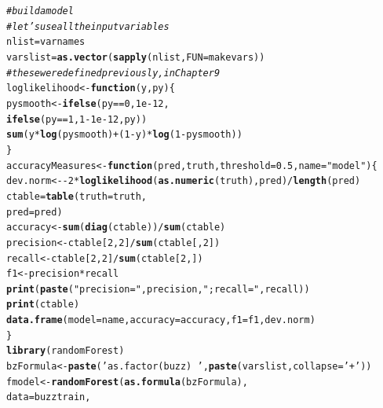 \documentclass{article}\usepackage[]{graphicx}\usepackage[]{color}
\makeatletter
\newcommand{\hlnum}[1]{\textcolor[rgb]{0.686,0.059,0.569}{#1}}%
\newcommand{\hlstr}[1]{\textcolor[rgb]{0.192,0.494,0.8}{#1}}%
\newcommand{\hlcom}[1]{\textcolor[rgb]{0.678,0.584,0.686}{\textit{#1}}}%
\newcommand{\hlopt}[1]{\textcolor[rgb]{0,0,0}{#1}}%
\newcommand{\hlstd}[1]{\textcolor[rgb]{0.345,0.345,0.345}{#1}}%
\newcommand{\hlkwa}[1]{\textcolor[rgb]{0.161,0.373,0.58}{\textbf{#1}}}%
\newcommand{\hlkwb}[1]{\textcolor[rgb]{0.69,0.353,0.396}{#1}}%
\newcommand{\hlkwc}[1]{\textcolor[rgb]{0.333,0.667,0.333}{#1}}%
\newcommand{\hlkwd}[1]{\textcolor[rgb]{0.737,0.353,0.396}{\textbf{#1}}}%
\newenvironment{kframe}{%
 \def\at@end@of@kframe{}%
 \ifinner\ifhmode%
  \def\at@end@of@kframe{\end{minipage}}%
  \begin{minipage}{\columnwidth}%
 \fi\fi%
 \def\FrameCommand##1{\hskip\@totalleftmargin \hskip-\fboxsep
 \colorbox{shadecolor}{##1}\hskip-\fboxsep
     \hskip-\linewidth \hskip-\@totalleftmargin \hskip\columnwidth}%
 \MakeFramed {\advance\hsize-\width
   \@totalleftmargin\z@ \linewidth\hsize
   \@setminipage}}%
 {\par\unskip\endMakeFramed%
 \at@end@of@kframe}
\newenvironment{knitrout}{}{} %
\makeatother
\begin{document}
\begin{knitrout}
\color{fgcolor}\begin{kframe}
\begin{alltt}
\hlcom{# build a model}
\hlcom{# let's use all the input variables}
\hlstd{nlist} \hlkwb{=} \hlstd{varnames}
\hlstd{varslist} \hlkwb{=} \hlkwd{as.vector}\hlstd{(}\hlkwd{sapply}\hlstd{(nlist,} \hlkwc{FUN}\hlstd{=makevars))}
\hlcom{# these were defined previously,  in Chapter 9}
\hlstd{loglikelihood} \hlkwb{<-} \hlkwa{function}\hlstd{(}\hlkwc{y}\hlstd{,} \hlkwc{py}\hlstd{) \{}
  \hlstd{pysmooth} \hlkwb{<-} \hlkwd{ifelse}\hlstd{(py}\hlopt{==}\hlnum{0}\hlstd{,} \hlnum{1e-12}\hlstd{,}
                     \hlkwd{ifelse}\hlstd{(py}\hlopt{==}\hlnum{1}\hlstd{,} \hlnum{1}\hlopt{-}\hlnum{1e-12}\hlstd{, py))}
  \hlkwd{sum}\hlstd{(y} \hlopt{*} \hlkwd{log}\hlstd{(pysmooth)} \hlopt{+} \hlstd{(}\hlnum{1}\hlopt{-}\hlstd{y)}\hlopt{*}\hlkwd{log}\hlstd{(}\hlnum{1} \hlopt{-} \hlstd{pysmooth))}
\hlstd{\}}
\hlstd{accuracyMeasures} \hlkwb{<-} \hlkwa{function}\hlstd{(}\hlkwc{pred}\hlstd{,} \hlkwc{truth}\hlstd{,} \hlkwc{threshold}\hlstd{=}\hlnum{0.5}\hlstd{,} \hlkwc{name}\hlstd{=}\hlstr{"model"}\hlstd{) \{}
  \hlstd{dev.norm} \hlkwb{<-} \hlopt{-}\hlnum{2}\hlopt{*}\hlkwd{loglikelihood}\hlstd{(}\hlkwd{as.numeric}\hlstd{(truth), pred)}\hlopt{/}\hlkwd{length}\hlstd{(pred)}
  \hlstd{ctable} \hlkwb{=} \hlkwd{table}\hlstd{(}\hlkwc{truth}\hlstd{=truth,}
                 \hlkwc{pred}\hlstd{=pred)}
  \hlstd{accuracy} \hlkwb{<-} \hlkwd{sum}\hlstd{(}\hlkwd{diag}\hlstd{(ctable))}\hlopt{/}\hlkwd{sum}\hlstd{(ctable)}
  \hlstd{precision} \hlkwb{<-} \hlstd{ctable[}\hlnum{2}\hlstd{,}\hlnum{2}\hlstd{]}\hlopt{/}\hlkwd{sum}\hlstd{(ctable[,}\hlnum{2}\hlstd{])}
  \hlstd{recall} \hlkwb{<-} \hlstd{ctable[}\hlnum{2}\hlstd{,}\hlnum{2}\hlstd{]}\hlopt{/}\hlkwd{sum}\hlstd{(ctable[}\hlnum{2}\hlstd{,])}
  \hlstd{f1} \hlkwb{<-} \hlstd{precision}\hlopt{*}\hlstd{recall}
  \hlkwd{print}\hlstd{(}\hlkwd{paste}\hlstd{(}\hlstr{"precision="}\hlstd{, precision,} \hlstr{"; recall="} \hlstd{, recall))}
  \hlkwd{print}\hlstd{(ctable)}
  \hlkwd{data.frame}\hlstd{(}\hlkwc{model}\hlstd{=name,} \hlkwc{accuracy}\hlstd{=accuracy,} \hlkwc{f1}\hlstd{=f1, dev.norm)}
\hlstd{\}}
\hlkwd{library}\hlstd{(randomForest)}
\hlstd{bzFormula} \hlkwb{<-} \hlkwd{paste}\hlstd{(}\hlstr{'as.factor(buzz) ~ '}\hlstd{,}\hlkwd{paste}\hlstd{(varslist,}\hlkwc{collapse}\hlstd{=}\hlstr{' + '}\hlstd{))}
\hlstd{fmodel} \hlkwb{<-} \hlkwd{randomForest}\hlstd{(}\hlkwd{as.formula}\hlstd{(bzFormula),}
                      \hlkwc{data}\hlstd{=buzztrain,}

\end{alltt}
\end{kframe}
\end{knitrout}
\end{document}
